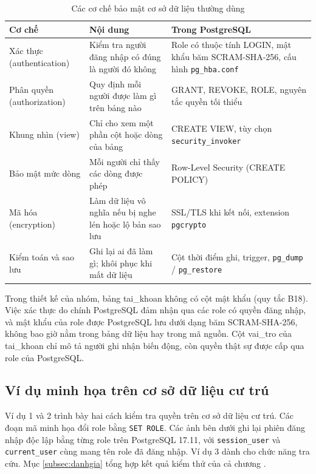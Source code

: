 \begin{table}[H]
\centering
\fontsize{12pt}{16pt}\selectfont
\renewcommand{\arraystretch}{1.15}
\begin{tabularx}{\textwidth}{|P{3.4cm}|Y|P{4.6cm}|}
\hline
\textbf{Cơ chế} & \textbf{Nội dung} & \textbf{Trong PostgreSQL} \\
\hline
Xác thực (authentication) & Kiểm tra người đăng nhập có đúng là người đó không & Role có thuộc tính LOGIN, mật khẩu băm SCRAM-SHA-256, cấu hình \texttt{pg\_hba.conf} \\
\hline
Phân quyền (authorization) & Quy định mỗi người được làm gì trên bảng nào & GRANT, REVOKE, ROLE, nguyên tắc quyền tối thiểu \\
\hline
Khung nhìn (view) & Chỉ cho xem một phần cột hoặc dòng của bảng & CREATE VIEW, tùy chọn \texttt{security\_invoker} \\
\hline
Bảo mật mức dòng & Mỗi người chỉ thấy các dòng được phép & Row-Level Security (CREATE POLICY) \\
\hline
Mã hóa (encryption) & Làm dữ liệu vô nghĩa nếu bị nghe lén hoặc lộ bản sao lưu & SSL/TLS khi kết nối, extension \texttt{pgcrypto} \\
\hline
Kiểm toán và sao lưu & Ghi lại ai đã làm gì; khôi phục khi mất dữ liệu & Cột thời điểm ghi, trigger, \texttt{pg\_dump} / \texttt{pg\_restore} \\
\hline
\end{tabularx}
\caption{Các cơ chế bảo mật cơ sở dữ liệu thường dùng}
\label{tab:coche}
\end{table}

Trong thiết kế của nhóm, bảng tai\_khoan không có cột mật khẩu (quy tắc B18). Việc xác thực do chính PostgreSQL đảm nhận qua các role có quyền đăng nhập, và mật khẩu của role được PostgreSQL lưu dưới dạng băm SCRAM-SHA-256, không bao giờ nằm trong bảng dữ liệu hay trong mã nguồn. Cột vai\_tro của tai\_khoan chỉ mô tả người ghi nhận biến động, còn quyền thật sự được cấp qua role của PostgreSQL.

\subsection{Ví dụ minh họa trên cơ sở dữ liệu cư trú}
\label{subsec:vidu}

Ví dụ 1 và 2 trình bày hai cách kiểm tra quyền trên cơ sở dữ liệu cư trú. Các đoạn mã minh họa đổi role bằng \texttt{SET ROLE}. Các ảnh bên dưới ghi lại phiên đăng nhập độc lập bằng từng role trên PostgreSQL 17.11, với \texttt{session\_user} và \texttt{current\_user} cùng mang tên role đã đăng nhập. Ví dụ 3 dành cho chức năng tra cứu. Mục \ref{subsec:danhgia} tổng hợp kết quả kiểm thử của cả chương \cite{postgres}.

